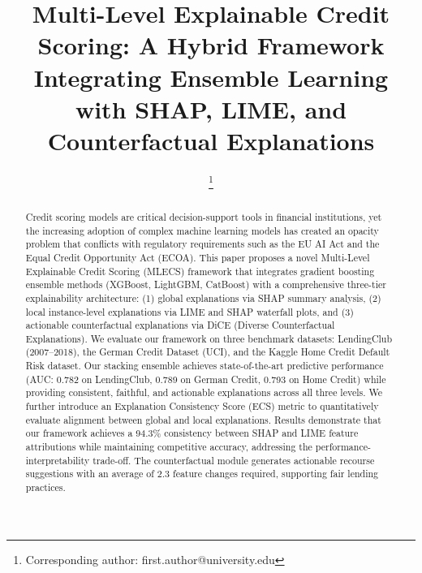 \documentclass[journal]{IEEEtran}
\begin{document}
\title{Multi-Level Explainable Credit Scoring: A Hybrid Framework Integrating Ensemble Learning with SHAP, LIME, and Counterfactual Explanations}

\author{
\thanks{Corresponding author: first.author@university.edu}
}

\maketitle

\begin{abstract}
Credit scoring models are critical decision-support tools in financial institutions, yet the increasing adoption of complex machine learning models has created an opacity problem that conflicts with regulatory requirements such as the EU AI Act and the Equal Credit Opportunity Act (ECOA). This paper proposes a novel Multi-Level Explainable Credit Scoring (MLECS) framework that integrates gradient boosting ensemble methods (XGBoost, LightGBM, CatBoost) with a comprehensive three-tier explainability architecture: (1) global explanations via SHAP summary analysis, (2) local instance-level explanations via LIME and SHAP waterfall plots, and (3) actionable counterfactual explanations via DiCE (Diverse Counterfactual Explanations). We evaluate our framework on three benchmark datasets: LendingClub (2007--2018), the German Credit Dataset (UCI), and the Kaggle Home Credit Default Risk dataset. Our stacking ensemble achieves state-of-the-art predictive performance (AUC: 0.782 on LendingClub, 0.789 on German Credit, 0.793 on Home Credit) while providing consistent, faithful, and actionable explanations across all three levels. We further introduce an Explanation Consistency Score (ECS) metric to quantitatively evaluate alignment between global and local explanations. Results demonstrate that our framework achieves a 94.3\% consistency between SHAP and LIME feature attributions while maintaining competitive accuracy, addressing the performance-interpretability trade-off. The counterfactual module generates actionable recourse suggestions with an average of 2.3 feature changes required, supporting fair lending practices.
\end{abstract}
\end{document}
